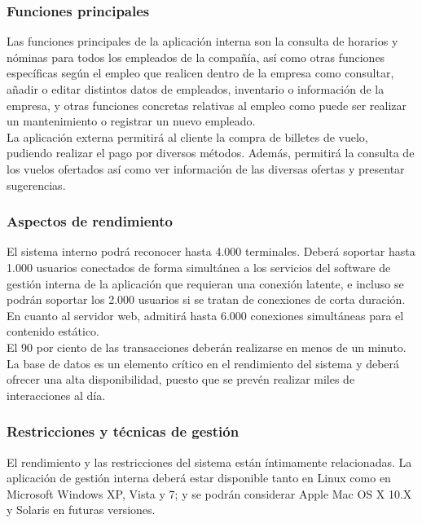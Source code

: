 \documentclass[11pt, a4paper, twoside, titlepage]{article}
\begin{document}
			\subsubsection{Funciones principales}
			Las funciones principales de la aplicación interna son la consulta de horarios y nóminas para todos los empleados de la compañía, así como otras funciones específicas según el empleo que realicen dentro de la empresa como consultar, añadir o editar distintos datos de empleados, inventario o información de la empresa, y otras funciones concretas relativas al empleo como puede ser realizar un mantenimiento o registrar un nuevo empleado. \\

			La aplicación externa permitirá al cliente la compra de billetes de vuelo, pudiendo realizar el pago por diversos métodos. Además, permitirá la consulta de los vuelos ofertados así como ver información de las diversas ofertas y presentar sugerencias.
			
			\subsubsection{Aspectos de rendimiento}
			El sistema interno podrá reconocer hasta 4.000 terminales. Deberá soportar hasta 1.000 usuarios conectados de forma simultánea a los servicios del software de gestión interna de la aplicación que requieran una conexión latente, e incluso se podrán soportar los 2.000 usuarios si se tratan de conexiones de corta duración.  En cuanto al servidor web, admitirá hasta 6.000 conexiones simultáneas para el contenido estático. \\

			El 90 por ciento de las transacciones deberán realizarse en menos de un minuto. La base de datos es un elemento crítico en el rendimiento del sistema y deberá ofrecer una alta disponibilidad, puesto que se prevén realizar miles de interacciones al día.

			\subsubsection{Restricciones y técnicas de gestión}
			El rendimiento y las restricciones del sistema están íntimamente relacionadas. La aplicación de gestión interna deberá estar disponible tanto en Linux como en Microsoft Windows XP, Vista y 7; y se podrán considerar Apple Mac OS X 10.X y Solaris en futuras versiones.  \\
\end{document}
